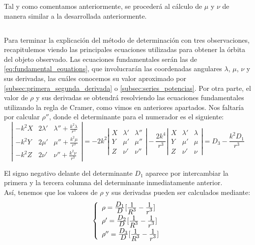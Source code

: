 \documentclass[11pt]{article}
\newcommand\ddfrac[2]{\frac{\displaystyle #1}{\displaystyle #2}}
\begin{document}
Tal y como comentamos anteriormente, se procederá al cálculo de $\mu$ y $\nu$ de manera similar a la desarrollada anteriormente.\\


\subsection{}
\label{subsec:fundamental_equations}
Para terminar la explicación del método de determinación con tres observaciones, recapitulemos viendo las principales ecuaciones utilizadas para obtener la órbita del objeto observado. Las ecuaciones fundamentales serán las de \eqref{eq:fundamental_equations}, que involucrarán las coordenadas angulares $\lambda$, $\mu$, $\nu$ y sus derivadas, las cuáles conocemos su valor aproximado por \ref{subsec:primera_segunda_derivada} o \ref{subsec:series_potencias}. Por otra parte, el valor de $\rho$ y sus derivadas se obtendrá resolviendo las ecuaciones fundamentales utilizando la regla de Cramer, como vimos en anteriores apartados. Nos faltaría por calcular $\rho''$, donde el determinante para el numerador es el siguiente: 
\[
\left|
\begin{array}{ccc}
-k^2X & 2\lambda' & \lambda''+\frac{k^2\lambda}{r^3}\\
-k^2Y & 2\mu' & \mu''+\frac{k^2\mu}{r^3}\\
-k^2Z & 2\nu' & \nu''+\frac{k^2\nu}{r^3}
\end{array}
\right|
=-2k^2
\left|
\begin{array}{ccc}
X & \lambda' & \lambda''\\
Y & \mu' & \mu''\\
Z & \nu' & \nu''
\end{array}
\right|
-\frac{2k^4}{r^3}
\left|
\begin{array}{ccc}
X & \lambda' & \lambda\\
Y & \mu' & \mu\\
Z & \nu' & \nu
\end{array}
\right|
=
D_3-\frac{k^2D_1}{r^3}
\]

El signo negativo delante del determinante $D_1$ aparece por intercambiar la primera y la tercera columna del determinante inmediatamente anterior.\\

Así, tenemos que los valores de $\rho$ y sus derivadas pueden ser calculados mediante:
\begin{align}
\left\{
\def\arraystretch{1.5}
\begin{array}{l}
	\rho   = \ddfrac{D_1}{D}[\ddfrac{1}{R^3}-\ddfrac{1}{r^3}]\\
	\rho'  = \ddfrac{D_2}{D}[\ddfrac{1}{R^3}-\ddfrac{1}{r^3}]\\
	\rho'' = \ddfrac{D_3}{D}[\ddfrac{1}{R^3}-\ddfrac{1}{r^3}]
\end{array}
\right.
\label{eq:rho_values}
\end{align}
\end{document}
